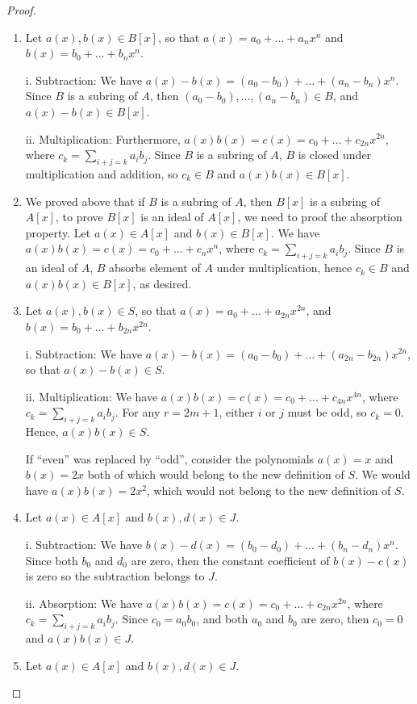 \begin{proof}
\begin{enumerate}
    \item Let $a(x), b(x)\in B[x]$, so that $a(x)=a_0+\dots+a_nx^n$ and $b(x)=b_0+\dots+b_nx^n$.
    
    i. Subtraction: We have $a(x)-b(x)=(a_0-b_0)+\dots+(a_n-b_n)x^n$. Since $B$ is a subring of $A$, then $(a_0-b_0),\dots,(a_n-b_n)\in B$, and $a(x)-b(x)\in B[x]$.
    
    ii. Multiplication: Furthermore, $a(x)b(x)=c(x)=c_0+\dots+c_{2n}x^{2n}$, where $c_k=\sum_{i+j=k}a_ib_j$. Since $B$ is a subring of $A$, $B$ is closed under multiplication and addition, so $c_k\in B$ and $a(x)b(x)\in B[x]$.
    \item We proved above that if $B$ is a subring of $A$, then $B[x]$ is a subring of $A[x]$, to prove $B[x]$ is an ideal of $A[x]$, we need to proof the absorption property. Let $a(x)\in A[x]$ and $b(x)\in B[x]$. We have $a(x)b(x)=c(x)=c_0+\dots+c_nx^n$, where $c_k=\sum_{i+j=k}a_ib_j$. Since $B$ is an ideal of $A$, $B$ absorbs element of $A$ under multiplication, hence $c_k\in B$ and $a(x)b(x)\in B[x]$, as desired.
    \item Let $a(x),b(x)\in S$, so that $a(x)=a_0+\dots+a_{2n}x^{2n}$, and $b(x)=b_0+\dots+b_{2n}x^{2n}$.
    
    i. Subtraction: We have $a(x)-b(x)=(a_0-b_0)+\dots+(a_{2n}-b_{2n})x^{2n}$, so that $a(x)-b(x)\in S$.
    
    ii. Multiplication: We have $a(x)b(x)=c(x)=c_0+\dots+c_{4n}x^{4n}$, where $c_k=\sum_{i+j=k}a_ib_j$. For any $r=2m+1$, either $i$ or $j$ must be odd, so $c_k=0$. Hence, $a(x)b(x)\in S$.
    
    If ``even'' was replaced by ``odd'', consider the polynomials $a(x)=x$ and $b(x)=2x$ both of which would belong to the new definition of $S$. We would have $a(x)b(x)=2x^2$, which would not belong to the new definition of $S$.
    \item Let $a(x)\in A[x]$ and $b(x),d(x)\in J$.
    
    i. Subtraction: We have $b(x)-d(x)=(b_0-d_0)+\dots+(b_n-d_n)x^n$. Since both $b_0$ and $d_0$ are zero, then the constant coefficient of $b(x)-c(x)$ is zero so the subtraction belongs to $J$.
    
    ii. Absorption: We have $a(x)b(x)=c(x)=c_0+\dots+c_{2n}x^{2n}$, where $c_k=\sum_{i+j=k}a_ib_j$. Since $c_0=a_0b_0$, and both $a_0$ and $b_0$ are zero, then $c_0=0$ and $a(x)b(x)\in J$.
    \item Let $a(x)\in A[x]$ and $b(x),d(x)\in J$.
    

\end{enumerate}
\end{proof}

